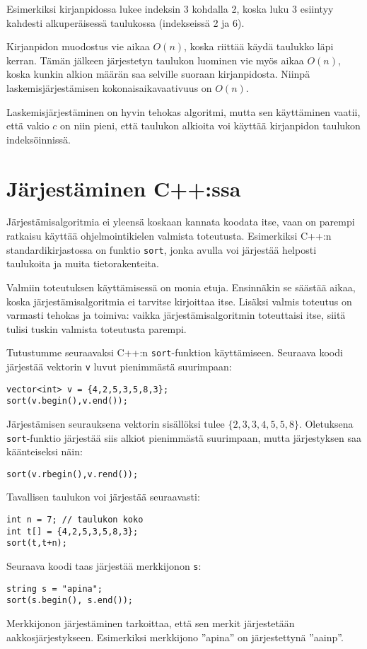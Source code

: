 Esimerkiksi kirjanpidossa lukee indeksin 3 kohdalla 2,
koska luku 3 esiintyy kahdesti alkuperäisessä
taulukossa (indekseissä 2 ja 6).

Kirjanpidon muodostus vie aikaa $O(n)$,
koska riittää käydä taulukko läpi kerran.
Tämän jälkeen järjestetyn taulukon luominen
vie myös aikaa $O(n)$, koska kunkin alkion
määrän saa selville suoraan kirjanpidosta.
Niinpä laskemisjärjestämisen
kokonaisaikavaativuus on $O(n)$.

Laskemisjärjestäminen on hyvin tehokas algoritmi,
mutta sen käyttäminen vaatii,
että vakio $c$ on niin pieni,
että taulukon alkioita voi käyttää
kirjanpidon taulukon indeksöinnissä.

\section{Järjestäminen C++:ssa}


Järjestämisalgoritmia
ei yleensä koskaan kannata koodata itse,
vaan on parempi ratkaisu käyttää
ohjelmointikielen valmista toteutusta.
Esimerkiksi
C++:n standardikirjastossa on funktio \texttt{sort},
jonka avulla voi järjestää helposti taulukoita
ja muita tietorakenteita.

Valmiin toteutuksen käyttämisessä on monia etuja.
Ensinnäkin se säästää aikaa, koska järjestämisalgoritmia
ei tarvitse kirjoittaa itse.
Lisäksi valmis toteutus on varmasti tehokas ja toimiva:
vaikka järjestämisalgoritmin toteuttaisi itse,
siitä tulisi tuskin valmista toteutusta parempi.

Tutustumme seuraavaksi C++:n \texttt{sort}-funktion
käyttämiseen.
Seuraava koodi järjestää vektorin \texttt{v}
luvut pienimmästä suurimpaan:
\begin{lstlisting}
vector<int> v = {4,2,5,3,5,8,3};
sort(v.begin(),v.end());
\end{lstlisting}
Järjestämisen seurauksena
vektorin sisällöksi tulee
$\{2,3,3,4,5,5,8\}$.
Oletuksena \texttt{sort}-funktio järjestää
siis alkiot pienimmästä suurimpaan,
mutta järjestyksen saa käänteiseksi näin:
\begin{lstlisting}
sort(v.rbegin(),v.rend());
\end{lstlisting}
Tavallisen taulukon voi järjestää seuraavasti:
\begin{lstlisting}
int n = 7; // taulukon koko
int t[] = {4,2,5,3,5,8,3};
sort(t,t+n);
\end{lstlisting}
Seuraava koodi taas järjestää merkkijonon \texttt{s}:
\begin{lstlisting}
string s = "apina";
sort(s.begin(), s.end());
\end{lstlisting}
Merkkijonon järjestäminen tarkoittaa,
että sen merkit järjestetään aakkosjärjestykseen.
Esimerkiksi merkkijono ''apina''
on järjestettynä ''aainp''.

